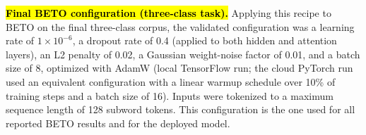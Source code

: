 \documentclass[informatics,article,accept,pdftex,moreauthors]{Definitions/mdpi}
\begin{document}
\textbf{\hl{Final BETO configuration (three-class task).}} Applying this recipe to BETO on the final three-class corpus, the validated configuration was a learning rate of $1 \times 10^{-6}$, a dropout rate of 0.4 (applied to both hidden and attention layers), an L2 penalty of 0.02, a Gaussian weight-noise factor of 0.01, and a batch size of 8, optimized with AdamW (local TensorFlow run; the cloud PyTorch run used an equivalent configuration with a linear warmup schedule over 10\% of training steps and a batch size of 16). Inputs were tokenized to a maximum sequence length of 128 subword tokens. This configuration is the one used for all reported BETO results and for the deployed model. %
\end{document}
